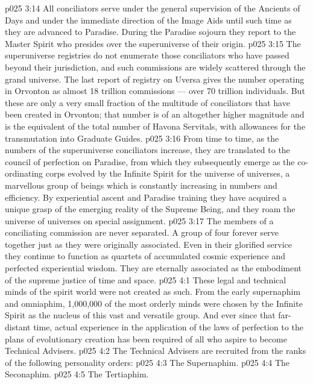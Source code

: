 \vs p025 3:14 \pc All conciliators serve under the general supervision of the Ancients of Days and under the immediate direction of the Image Aids until such time as they are advanced to Paradise. During the Paradise sojourn they report to the Master Spirit who presides over the superuniverse of their origin.
\vs p025 3:15 The superuniverse registries do not enumerate those conciliators who have passed beyond their jurisdiction, and such commissions are widely scattered through the grand universe. The last report of registry on Uversa gives the number operating in Orvonton as almost 18 trillion commissions --- over 70 trillion individuals. But these are only a very small fraction of the multitude of conciliators that have been created in Orvonton; that number is of an altogether higher magnitude and is the equivalent of the total number of Havona Servitals, with allowances for the transmutation into Graduate Guides.
\vs p025 3:16 From time to time, as the numbers of the superuniverse conciliators increase, they are translated to the council of perfection on Paradise, from which they subsequently emerge as the co\hyp{}ordinating corps evolved by the Infinite Spirit for the universe of universes, a marvellous group of beings which is constantly increasing in numbers and efficiency. By experiential ascent and Paradise training they have acquired a unique grasp of the emerging reality of the Supreme Being, and they roam the universe of universes on special assignment.
\vs p025 3:17 The members of a conciliating commission are never separated. A group of four forever serve together just as they were originally associated. Even in their glorified service they continue to function as quartets of accumulated cosmic experience and perfected experiential wisdom. They are eternally associated as the embodiment of the supreme justice of time and space.
\vs p025 4:1 These legal and technical minds of the spirit world were not created as such. From the early supernaphim and omniaphim, 1,000,000 of the most orderly minds were chosen by the Infinite Spirit as the nucleus of this vast and versatile group. And ever since that far\hyp{}distant time, actual experience in the application of the laws of perfection to the plans of evolutionary creation has been required of all who aspire to become Technical Advisers.
\vs p025 4:2 \pc The Technical Advisers are recruited from the ranks of the following personality orders:
\vs p025 4:3 \bibnobreakspace The Supernaphim.
\vs p025 4:4 \bibnobreakspace The Seconaphim.
\vs p025 4:5 \bibnobreakspace The Tertiaphim.

